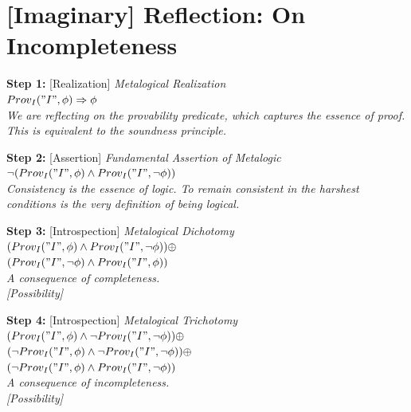 \documentclass[runningheads]{llncs}
\begin{document}
\section{[Imaginary] Reflection: On Incompleteness}

\vspace{0.5em}

\noindent\textbf{Step 1:} [Realization] \hfill \textit{Metalogical Realization}\\
\noindent$Prov_I("I", \phi) \Rightarrow \phi$\\
\textit{We are reflecting on the provability predicate, which captures the essence of proof. This is equivalent to the soundness principle.}

\vspace{1.5em}

\noindent\textbf{Step 2:} [Assertion] \hfill \textit{Fundamental Assertion of Metalogic}\\
\noindent$\neg(Prov_I("I", \phi) \land Prov_I("I", \neg\phi))$\\
\textit{Consistency is the essence of logic. To remain consistent in the harshest conditions is the very definition of being logical.}

\vspace{1.5em}

\noindent\textbf{Step 3:} [Introspection] \hfill \textit{Metalogical Dichotomy}\\
\noindent$(Prov_I("I", \phi) \land Prov_I("I", \neg\phi)) \oplus$\\
\noindent$(Prov_I("I", \neg\phi) \land Prov_I("I", \phi))$\\
\textit{A consequence of completeness.}\\
\noindent\textit{[Possibility]}

\vspace{1.5em}

\noindent\textbf{Step 4:} [Introspection] \hfill \textit{Metalogical Trichotomy}\\
\noindent$(Prov_I("I", \phi) \land \neg Prov_I("I", \neg\phi)) \oplus$\\
\noindent$(\neg Prov_I("I", \phi) \land \neg Prov_I("I", \neg\phi)) \oplus$\\
\noindent$(\neg Prov_I("I", \phi) \land Prov_I("I", \neg\phi))$\\
\textit{A consequence of incompleteness.}\\
\noindent\textit{[Possibility]}

\vspace{1.5em}
\end{document}
